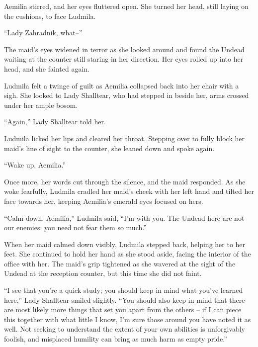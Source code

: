 Aemilia stirred, and her eyes fluttered open. She turned her head, still laying on the cushions, to face Ludmila.

 

“Lady Zahradnik, what–”

 

The maid’s eyes widened in terror as she looked around and found the Undead waiting at the counter still staring in her direction. Her eyes rolled up into her head, and she fainted again.

 

Ludmila felt a twinge of guilt as Aemilia collapsed back into her chair with a sigh. She looked to Lady Shalltear, who had stepped in beside her, arms crossed under her ample bosom.

 

“Again,” Lady Shalltear told her.

 

Ludmila licked her lips and cleared her throat. Stepping over to fully block her maid’s line of sight to the counter, she leaned down and spoke again.

 

“Wake up, Aemilia.”

 

Once more, her words cut through the silence, and the maid responded. As she woke fearfully, Ludmila cradled her maid’s cheek with her left hand and tilted her face towards her, keeping Aemilia’s emerald eyes focused on hers.

 

“Calm down, Aemilia,” Ludmila said, “I’m with you. The Undead here are not our enemies: you need not fear them so much.”

 

When her maid calmed down visibly, Ludmila stepped back, helping her to her feet. She continued to hold her hand as she stood aside, facing the interior of the office with her. The maid’s grip tightened as she wavered at the sight of the Undead at the reception counter, but this time she did not faint.

 

“I see that you’re a quick study; you should keep in mind what you’ve learned here,” Lady Shalltear smiled slightly. “You should also keep in mind that there are most likely more things that set you apart from the others – if I can piece this together with what little I know, I’m sure those around you have noted it as well. Not seeking to understand the extent of your own abilities is unforgivably foolish, and misplaced humility can bring as much harm as empty pride.”


